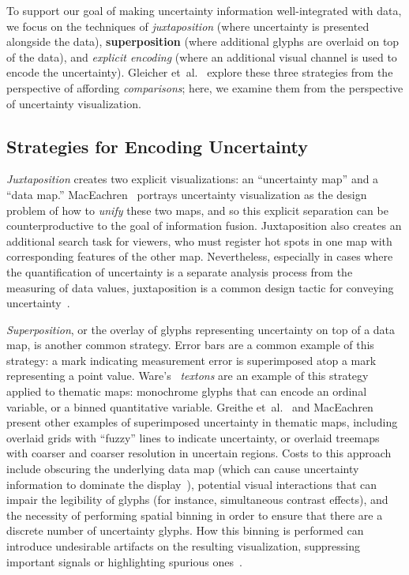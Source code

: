 \documentclass{vgtc}                          %
\newcommand{\ea}{{et~al.}\xspace}
\begin{document}
To support our goal of making uncertainty information well-integrated with data, we focus on the techniques of \emph{juxtaposition} (where uncertainty is presented alongside the data), \textbf{superposition} (where additional glyphs are overlaid on top of the data), and \emph{explicit encoding} (where an additional visual channel is used to encode the uncertainty). Gleicher \ea~\cite{gleicher2011visual} explore these three strategies from the perspective of affording \emph{comparisons}; here, we examine them from the perspective of uncertainty visualization.

\subsection{Strategies for Encoding Uncertainty}

\emph{Juxtaposition} creates two explicit visualizations: an ``uncertainty map'' and a ``data map.'' MacEachren~\cite{maceachren1992visualizing} portrays uncertainty visualization as the design problem of how to \emph{unify} these two maps, and so this explicit separation can be counterproductive to the goal of information fusion. Juxtaposition also creates an additional search task for viewers, who must register hot spots in one map with corresponding features of the other map. Nevertheless, especially in cases where the quantification of uncertainty is a separate analysis process from the measuring of data values, juxtaposition is a common design tactic for conveying uncertainty~\cite{moritz2017trust}.

\emph{Superposition}, or the overlay of glyphs representing uncertainty on top of a data map, is another common strategy. Error bars are a common example of this strategy: a mark indicating measurement error is superimposed atop a mark representing a point value. Ware's~\cite{ware2009quantitative} \emph{textons} are an example of this strategy applied to thematic maps: monochrome glyphs that can encode an ordinal variable, or a binned quantitative variable. Greithe \ea~\cite{griethe2006visualization} and MacEachren~\cite{maceachren1992visualizing,maceachren1998visualizing} present other examples of superimposed uncertainty in thematic maps, including overlaid grids with ``fuzzy'' lines to indicate uncertainty, or overlaid treemaps with coarser and coarser resolution in uncertain regions. Costs to this approach include obscuring the underlying data map (which can cause uncertainty information to dominate the display~\cite{brodlie2012review}), potential visual interactions that can impair the legibility of glyphs (for instance, simultaneous contrast effects), and the necessity of performing spatial binning in order to ensure that there are a discrete number of uncertainty glyphs. How this binning is performed can introduce undesirable artifacts on the resulting visualization, suppressing important signals or highlighting spurious ones~\cite{battersby2016shapes}.
\end{document}
